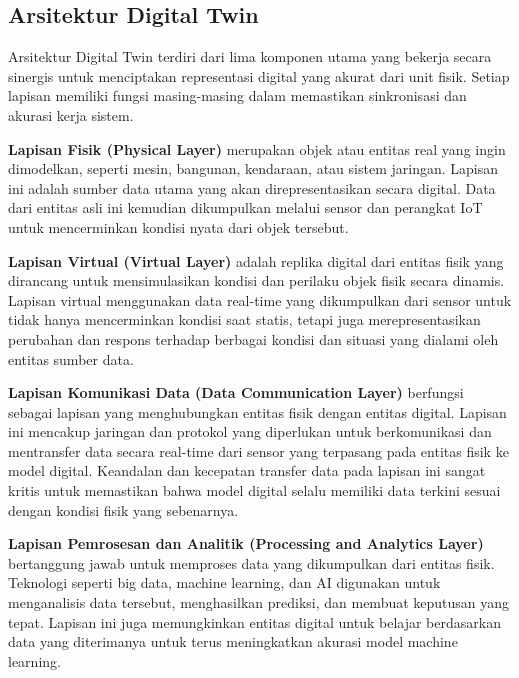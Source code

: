 \subsection{Arsitektur Digital Twin}

Arsitektur Digital Twin terdiri dari lima komponen utama yang bekerja secara sinergis untuk menciptakan representasi digital yang akurat dari unit fisik. Setiap lapisan memiliki fungsi masing-masing dalam memastikan sinkronisasi dan akurasi kerja sistem.



\textbf{Lapisan Fisik (Physical Layer)} merupakan objek atau entitas real yang ingin dimodelkan, seperti mesin, bangunan, kendaraan, atau sistem jaringan. Lapisan ini adalah sumber data utama yang akan direpresentasikan secara digital. Data dari entitas asli ini kemudian dikumpulkan melalui sensor dan perangkat IoT untuk mencerminkan kondisi nyata dari objek tersebut.

\textbf{Lapisan Virtual (Virtual Layer)} adalah replika digital dari entitas fisik yang dirancang untuk mensimulasikan kondisi dan perilaku objek fisik secara dinamis. Lapisan virtual menggunakan data real-time yang dikumpulkan dari sensor untuk tidak hanya mencerminkan kondisi saat statis, tetapi juga merepresentasikan perubahan dan respons terhadap berbagai kondisi dan situasi yang dialami oleh entitas sumber data.

\textbf{Lapisan Komunikasi Data (Data Communication Layer)} berfungsi sebagai lapisan yang menghubungkan entitas fisik dengan entitas digital. Lapisan ini mencakup jaringan dan protokol yang diperlukan untuk berkomunikasi dan mentransfer data secara real-time dari sensor yang terpasang pada entitas fisik ke model digital. Keandalan dan kecepatan transfer data pada lapisan ini sangat kritis untuk memastikan bahwa model digital selalu memiliki data terkini sesuai dengan kondisi fisik yang sebenarnya.

\textbf{Lapisan Pemrosesan dan Analitik (Processing and Analytics Layer)} bertanggung jawab untuk memproses data yang dikumpulkan dari entitas fisik. Teknologi seperti big data, machine learning, dan AI digunakan untuk menganalisis data tersebut, menghasilkan prediksi, dan membuat keputusan yang tepat. Lapisan ini juga memungkinkan entitas digital untuk belajar berdasarkan data yang diterimanya untuk terus meningkatkan akurasi model machine learning.

